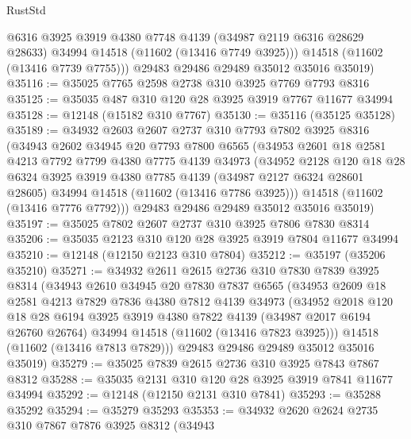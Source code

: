 \begin{lexlean}{RustStd}
\begin{coremodule}
          @6316
          @3925
          @3919
          @4380
          @7748
          @4139
          (@34987 @2119 @6316 @28629 @28633)
          @34994
          @14518
          (@11602 (@13416 @7749 @3925)))
        @14518
        (@11602 (@13416 @7739 @7755)))
      @29483
      @29486
      @29489
      @35012
      @35016
      @35019)
@35116 := @35025 @7765 @2598 @2738 @310 @3925 @7769 @7793 @8316
@35125 := @35035 @487 @310 @120 @28 @3925 @3919 @7767 @11677 @34994
@35128 := @12148 (@15182 @310 @7767)
@35130 := @35116 (@35125 @35128)
@35189 := @34932
    @2603
    @2607
    @2737
    @310
    @7793
    @7802
    @3925
    @8316
    (@34943
      @2602
      @34945
      @20
      @7793
      @7800
      @6565
      (@34953
        @2601
        @18
        @2581
        @4213
        @7792
        @7799
        @4380
        @7775
        @4139
        @34973
        (@34952
          @2128
          @120
          @18
          @28
          @6324
          @3925
          @3919
          @4380
          @7785
          @4139
          (@34987 @2127 @6324 @28601 @28605)
          @34994
          @14518
          (@11602 (@13416 @7786 @3925)))
        @14518
        (@11602 (@13416 @7776 @7792)))
      @29483
      @29486
      @29489
      @35012
      @35016
      @35019)
@35197 := @35025 @7802 @2607 @2737 @310 @3925 @7806 @7830 @8314
@35206 := @35035 @2123 @310 @120 @28 @3925 @3919 @7804 @11677 @34994
@35210 := @12148 (@12150 @2123 @310 @7804)
@35212 := @35197 (@35206 @35210)
@35271 := @34932
    @2611
    @2615
    @2736
    @310
    @7830
    @7839
    @3925
    @8314
    (@34943
      @2610
      @34945
      @20
      @7830
      @7837
      @6565
      (@34953
        @2609
        @18
        @2581
        @4213
        @7829
        @7836
        @4380
        @7812
        @4139
        @34973
        (@34952
          @2018
          @120
          @18
          @28
          @6194
          @3925
          @3919
          @4380
          @7822
          @4139
          (@34987 @2017 @6194 @26760 @26764)
          @34994
          @14518
          (@11602 (@13416 @7823 @3925)))
        @14518
        (@11602 (@13416 @7813 @7829)))
      @29483
      @29486
      @29489
      @35012
      @35016
      @35019)
@35279 := @35025 @7839 @2615 @2736 @310 @3925 @7843 @7867 @8312
@35288 := @35035 @2131 @310 @120 @28 @3925 @3919 @7841 @11677 @34994
@35292 := @12148 (@12150 @2131 @310 @7841)
@35293 := @35288 @35292
@35294 := @35279 @35293
@35353 := @34932
    @2620
    @2624
    @2735
    @310
    @7867
    @7876
    @3925
    @8312
    (@34943

\end{coremodule}
\end{lexlean}
